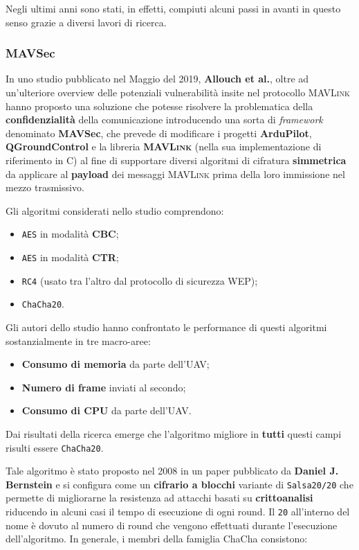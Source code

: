 \documentclass[a4paper, 12pt, oneside]{article}
\theoremstyle{definition}
\begin{document}
Negli ultimi anni sono stati, in effetti, compiuti alcuni passi in avanti in questo senso grazie a diversi lavori di ricerca.

\subsubsection{MAVSec}
In uno studio \cite{DBLP:journals/corr/abs-1905-00265} pubblicato nel Maggio del 2019, \textbf{Allouch et al.}, oltre ad un'ulteriore overview delle potenziali vulnerabilità insite nel protocollo \textsc{MAVLink} hanno proposto una soluzione che potesse risolvere la problematica della \textbf{confidenzialità} della comunicazione introducendo una sorta di \textit{framework} denominato \textbf{MAVSec}, che prevede di modificare i progetti \textbf{ArduPilot}, \textbf{QGroundControl} e la libreria \textbf{\textsc{MAVLink}} (nella sua implementazione di riferimento in C) al fine di supportare diversi algoritmi di cifratura \textbf{simmetrica} da applicare al \textbf{payload} dei messaggi \textsc{MAVLink} prima della loro immissione nel mezzo trasmissivo.

Gli algoritmi considerati nello studio comprendono:

\begin{itemize}
    \item \texttt{AES} in modalità \textbf{CBC};
    \item \texttt{AES} in modalità \textbf{CTR};
    \item \texttt{RC4} (usato tra l'altro dal protocollo di sicurezza WEP);
    \item \texttt{ChaCha20}.
\end{itemize}

Gli autori dello studio hanno confrontato le performance di questi algoritmi sostanzialmente in tre macro-aree:

\begin{itemize}
    \item \textbf{Consumo di memoria} da parte dell'UAV;
    \item \textbf{Numero di frame} inviati al secondo;
    \item \textbf{Consumo di CPU} da parte dell'UAV.
\end{itemize}

Dai risultati della ricerca emerge che l'algoritmo migliore in \textbf{tutti} questi campi risulti essere \texttt{ChaCha20}.

Tale algoritmo è stato proposto nel 2008 in un paper \cite{chacha20} pubblicato da \textbf{Daniel J. Bernstein} e si configura come un \textbf{cifrario a blocchi} variante di \texttt{Salsa20/20} che permette di migliorarne la resistenza ad attacchi basati su \textbf{crittoanalisi} riducendo in alcuni casi il tempo di esecuzione di ogni round. Il \texttt{20} all'interno del nome è dovuto al numero di round che vengono effettuati durante l'esecuzione dell'algoritmo. In generale, i membri della famiglia ChaCha consistono:
\end{document}
